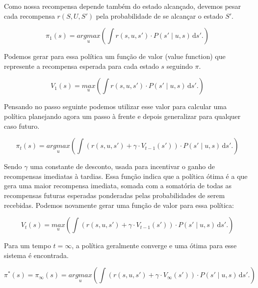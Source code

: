 Como nossa recompensa depende também do estado alcançado, devemos pesar cada recompensa $ r \left( S, U, S' \right) $ pela probabilidade de se alcançar o estado $ S' $.

\begin{equation}
    \pi_1 \left( s \right) = \underset{u}{argmax} \left( \int \! r \left( s, u, s' \right) \cdot P \left( s' \mid u, s \right) \, \mathrm{d}s'. \right)
\end{equation}

Podemos gerar para essa política um função de valor (value function) que represente a recompensa esperada para cada estado $ s $ seguindo $ \pi $.

\begin{equation}
    V_1 \left( s \right) = \underset{u}{max} \left( \int \! r \left( s, u, s' \right) \cdot P \left( s' \mid u, s \right) \, \mathrm{d}s'. \right)
\end{equation}

Pensando no passo seguinte podemos utilizar esse valor para calcular uma política planejando agora um passo à frente e depois generalizar para qualquer caso futuro.

\begin{equation}
    \pi_t \left( s \right) = \underset{u}{argmax} \left( \int \! \left( r \left( s, u, s' \right) + \gamma \cdot V_{t-1} \left( s' \right) \right) \cdot P \left( s' \mid u, s \right) \, \mathrm{d}s'. \right)
\end{equation}

Sendo $ \gamma $ uma constante de desconto, usada para incentivar o ganho de recompensas imediatas à tardias. Essa função indica que a política ótima é a que gera uma maior recompensa imediata, somada com a somatória de todas as recompensas futuras esperadas ponderadas pelas probabilidades de serem recebidas. Podemos novamente gerar uma função de valor para essa política:

\begin{equation}
    V_t \left( s \right) = \underset{u}{max} \left( \int \! \left( r \left( s, u, s' \right) + \gamma \cdot V_{t-1} \left( s' \right) \right) \cdot P \left( s' \mid u, s \right) \, \mathrm{d}s'. \right)
\end{equation}

Para um tempo $ t = \infty $, a política geralmente converge e uma ótima para esse sistema é encontrada.

\begin{equation}
    \pi^* \left( s \right) = \pi_\infty \left( s \right) = \underset{u}{argmax} \left( \int \! \left( r \left( s, u, s' \right) + \gamma \cdot V_\infty \left( s' \right) \right) \cdot P \left( s' \mid u, s \right) \, \mathrm{d}s'. \right)
\end{equation}

